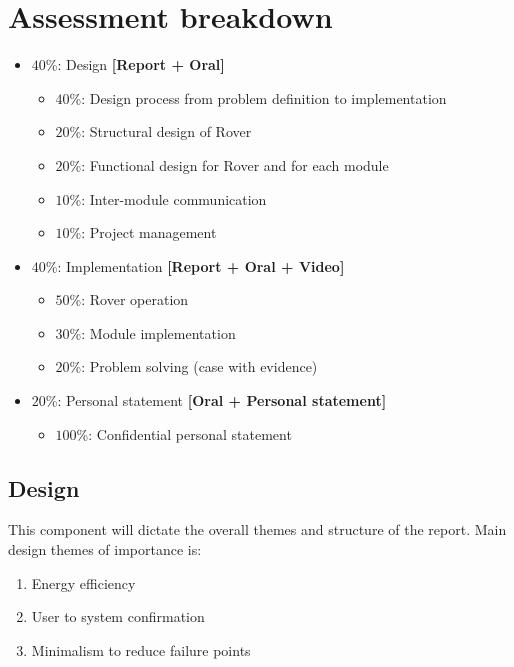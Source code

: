 \documentclass[10pt, a4paper]{article}
\begin{document}
\pagebreak

\section{Assessment breakdown}

\begin{itemize}
    \item $40$\%: Design \textbf{[Report + Oral]} 
    \begin{itemize}
        \item $40$\%: Design process from problem definition to implementation
        \item $20$\%: Structural design of Rover
        \item $20$\%: Functional design for Rover and for each module
        \item $10$\%: Inter-module communication 
        \item $10$\%: Project management 
    \end{itemize}

    \item $40$\%: Implementation \textbf{[Report + Oral + Video]} 
    \begin{itemize}
        \item $50$\%: Rover operation
        \item $30$\%: Module implementation 
        \item $20$\%: Problem solving (case with evidence)
    \end{itemize}

    \item $20$\%: Personal statement \textbf{[Oral + Personal statement]} 
    \begin{itemize}
        \item $100$\%: Confidential personal statement
    \end{itemize}
\end{itemize}

\subsection{Design}

This component will dictate the overall themes and structure of the report. Main design themes of importance is:
\begin{enumerate}
    \item Energy efficiency 
    \item User to system confirmation 
    \item Minimalism to reduce failure points 
\end{enumerate}
\end{document}
